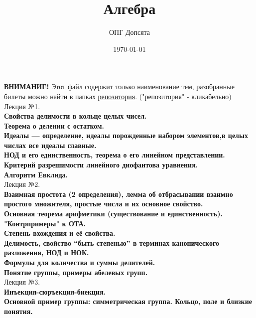 \documentclass[12pt]{article}
\title{Алгебра}
\author{ОПГ Допсята}
\date{\today}
\begin{document}
\maketitle
\large

\textbf{ВНИМАНИЕ!} Этот файл содержит только наименование тем, разобранные билеты можно найти в папках \href{https://github.com/Win4ap/algebra-exam-2023}{репозитория}. ("репозитория" - кликабельно)\\

Лекция №1.\\
\textbf{Свойства делимости в кольце целых чисел.}\\

\textbf{Теорема о делении с остатком.}\\

\textbf{Идеалы — определение, идеалы порожденные набором элементов,в целых числах все идеалы главные.}\\

\textbf{НОД и его единственность, теорема о его линейном представлении.}\\

\textbf{Критерий разрешимости линейного диофантова уравнения.}\\

\textbf{Алгоритм Евклида.}\\

Лекция №2.\\
\textbf{Взаимная простота (2 определения), лемма об отбрасывании взаимно простого множителя, простые числа и их основное свойство.}\\

\textbf{Основная теорема арифметики (существование и единственность).
"Контрпримеры" к ОТА.}\\

\textbf{Степень вхождения и её свойства.}\\

\textbf{Делимость, свойство “быть степенью” в терминах канонического разложения, НОД и НОК.}\\

\textbf{Формулы для количества и суммы делителей.}\\

\textbf{Понятие группы, примеры абелевых групп.}\\

Лекция №3.\\
\textbf{Инъекция-сюръекция-биекция.}\\

\textbf{Основной пример группы: симметрическая группа. Кольцо, поле и близкие понятия.}\\
\end{document}
